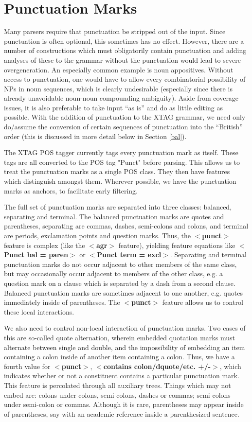 
\chapter{Punctuation Marks}

Many parsers require that punctuation be stripped out of the
input. Since punctuation is often optional, this sometimes has no
effect. However, there are a number of constructions which must
obligatorily contain punctuation and adding analyses of these to the
grammar without the punctuation would lead to severe
overgeneration. An especially common example is noun
appositives. Without access to punctuation, one would have to allow
every combinatorial possibility of NPs in noun sequences, which is
clearly undesirable (especially since there is already unavoidable
noun-noun compounding ambiguity). Aside from coverage issues, it is
also preferable to take input ``as is'' and do as little editing as
possible. With the addition of punctuation to the XTAG grammar, we
need only do/assume the conversion of certain sequences of punctuation
into the ``British'' order (this is discussed in more detail below in
Section \ref{bal}).

The XTAG POS tagger currently tags every punctuation mark as
itself. These tags are all converted to the POS tag "Punct" before
parsing. This allows us to treat the punctuation marks as a single POS
class. They then have features which distinguish amongst them.
Wherever possible, we have the punctuation marks as anchors, to
facilitate early filtering.

The full set of punctuation marks are separated into three classes:
balanced, separating and terminal. The balanced punctuation marks are
quotes and parentheses, separating are commas, dashes, semi-colons and
colons, and terminal are periods, exclamation points and question
marks. Thus, the {\bf $<$punct$>$} feature is complex (like the {\bf
$<$agr$>$} feature), yielding feature equations like {\bf $<$Punct bal
= paren$>$} or {\bf $<$Punct term = excl$>$}. Separating and terminal
punctuation marks do not occur adjacent to other members of the same
class, but may occasionally occur adjacent to members of the other
class, e.g. a question mark on a clause which is separated by a dash
from a second clause. Balanced punctuation marks are sometimes adjacent
to one another, e.g. quotes immediately inside of parentheses. The
{\bf $<$punct$>$} feature allows us to control these local
interactions.

We also need to control non-local interaction of punctuation
marks. Two cases of this are so-called quote alternation, wherein
embedded quotation marks must alternate between single and double, and
the impossibility of embedding an item containing a colon inside of
another item containing a colon. Thus, we have a fourth value for {\bf
$<$punct$>$}, {\bf $<$contains colon/dquote/etc. +/-$>$}, which
indicates whether or not a constituent contains a particular
punctuation mark. This feature is percolated through all auxiliary
trees.  Things which may not embed are: colons under colons,
semi-colons, dashes or commas; semi-colons under semi-colon or commas.
Although it is rare, parentheses may appear inside of parentheses, say
with an academic reference inside a parenthesized sentence.
 
